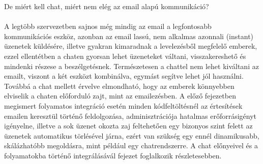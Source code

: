 De miért kell chat, miért nem elég az email alapú kommunikáció?\\
\hfill\\
A legtöbb szervezetben sajnos még mindig az email a legfontosabb kommunikációs eszköz, azonban az email lassú, nem alkalmas azonnali (instant) üzenetek küldésére, illetve gyakran kimaradnak a levelezésből megfelelő emberek, ezzel ellentétben a chaten gyorsan lehet üzeneteket váltani, visszakereshető és mindenki részese a beszélgetésnek. Természetesen a chattel nem lehet kiváltani az emailt, viszont a két eszközt kombinálva, egymást segítve lehet jól használni.
Továbbá a chat mellett érvelve elmondható, hogy az emberek könnyebben elviselik a chaten előforduló zajt, mint az emailezésben. A előző fejezetben megismert folyamatos integráció esetén minden kódfeltöltésnél az értesítések emailen keresztül történő feldolgozása, adminisztrációja hatalmas erőforrásigényt igényelne, illetve a sok üzenet okozta zaj feltehetően egy bizonyos szint felett az üzenetek automatikus törlésével járna, ezért van szükség egy ennél dinamikusabb, skálázhatóbb megoldásra, mint például egy chatrendszerre. A chat előnyeivel és a folyamatokba történő integrálásávál  fejezet foglalkozik részletesebben.

